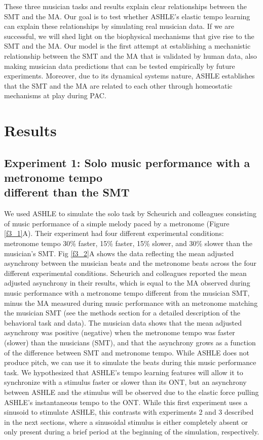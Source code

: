\documentclass{report}
\begin{document}
These three musician tasks and results explain clear relationships between the SMT and the MA. Our goal is to test whether ASHLE's elastic tempo learning can explain these relationships by simulating real musician data. If we are successful, we will shed light on the biophysical mechanisms that give rise to the SMT and the MA. Our model is the first attempt at establishing a mechanistic relationship between the SMT and the MA that is validated by human data, also making musician data predictions that can be tested empirically by future experiments. Moreover, due to its dynamical systems nature, ASHLE establishes that the SMT and the MA are related to each other through homeostatic mechanisms at play during PAC.

\section{Results}

\subsection{Experiment 1: Solo music performance with a metronome tempo \\ different than the SMT}

We used ASHLE to simulate the solo task by Scheurich and colleagues \cite{scheurich2018tapping} consisting of music performance of a simple melody paced by a metronome (Figure \ref{f3_1}A). Their experiment had four different experimental conditions: metronome tempo 30\% faster, 15\% faster, 15\% slower, and 30\% slower than the musician's SMT. Fig \ref{f3_2}A shows the data reflecting the mean adjusted asynchrony between the musician beats and the metronome beats across the four different experimental conditions. Scheurich and colleagues \cite{scheurich2018tapping} reported the mean adjusted asynchrony in their results, which is equal to the MA observed during music performance with a metronome tempo different from the musician SMT, minus the MA measured during music performance with an metronome matching the musician SMT (see the methods section for a detailed description of the behavioral task and data). The musician data shows that the mean adjusted asynchrony was positive (negative) when the metronome tempo was faster (slower) than the musicians (SMT), and that the asynchrony grows as a function of the difference between SMT and metronome tempo. While ASHLE does not produce pitch, we can use it to simulate the beats during this music performance task. We hypothesized that ASHLE's tempo learning features will allow it to synchronize with a stimulus faster or slower than its ONT, but an asynchrony between ASHLE and the stimulus will be observed due to the elastic force pulling ASHLE's instantaneous tempo to the ONT. While this first experiment uses a sinusoid to stimulate ASHLE, this contrasts with experiments 2 and 3 described in the next sections, where a sinusoidal stimulus is either completely absent or only present during a brief period at the beginning of the simulation, respectively.
\end{document}
